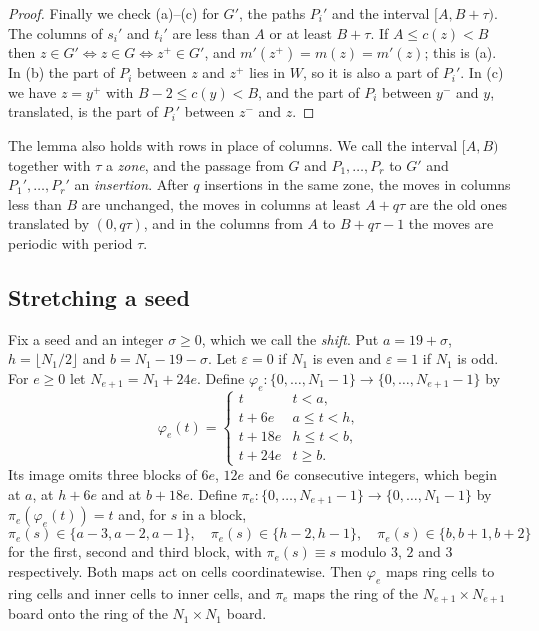 \documentclass[11pt]{amsart}
\theoremstyle{remark}
\begin{document}
\begin{proof}
Finally we check (a)--(c) for $G'$, the paths $P_i'$ and the interval $[A,B+\tau)$. The columns of $s_i'$ and
$t_i'$ are less than $A$ or at least $B+\tau$. If $A\le c(z)<B$ then
$z\in G'\iff z\in G\iff z^+\in G'$, and $m'(z^+)=m(z)=m'(z)$; this is (a). In (b) the part of $P_i$ between $z$ and
$z^+$ lies in $W$, so it is also a part of $P_i'$. In (c) we have $z=y^+$ with $B-2\le c(y)<B$, and the part of
$P_i$ between $y^-$ and $y$, translated, is the part of $P_i'$ between $z^-$ and $z$.
\end{proof}

The lemma also holds with rows in place of columns. We call the interval $[A,B)$ together with $\tau$ a
\emph{zone}, and the passage from $G$ and $P_1,\dots,P_r$ to $G'$ and $P_1',\dots,P_r'$ an \emph{insertion}. After
$q$ insertions in the same zone, the moves in columns less than $B$ are unchanged, the moves in columns at least
$A+q\tau$ are the old ones translated by $(0,q\tau)$, and in the columns from $A$ to $B+q\tau-1$ the moves are
periodic with period $\tau$.

\subsection*{Stretching a seed}
Fix a seed and an integer $\sigma\ge0$, which we call the \emph{shift}. Put $a=19+\sigma$,
$h=\lfloor N_1/2\rfloor$ and $b=N_1-19-\sigma$. Let $\varepsilon=0$ if $N_1$ is even and
$\varepsilon=1$ if $N_1$ is odd. For $e\ge0$ let $N_{e+1}=N_1+24e$. Define
$\varphi_e\colon\{0,\dots,N_1-1\}\to\{0,\dots,N_{e+1}-1\}$ by
\[ \varphi_e(t)=\begin{cases} t & t<a,\\ t+6e & a\le t<h,\\ t+18e & h\le t<b,\\ t+24e & t\ge b.\end{cases} \]
Its image omits three blocks of $6e$, $12e$ and $6e$ consecutive integers, which begin at $a$, at $h+6e$ and at
$b+18e$. Define $\pi_e\colon\{0,\dots,N_{e+1}-1\}\to\{0,\dots,N_1-1\}$ by $\pi_e(\varphi_e(t))=t$ and, for $s$ in a
block,
\[ \pi_e(s)\in\{a-3,a-2,a-1\},\quad \pi_e(s)\in\{h-2,h-1\},\quad \pi_e(s)\in\{b,b+1,b+2\} \]
for the first, second and third block, with $\pi_e(s)\equiv s$ modulo $3$, $2$ and $3$ respectively. Both maps act
on cells coordinatewise. Then $\varphi_e$ maps ring cells to ring cells and inner cells to inner cells, and $\pi_e$
maps the ring of the $N_{e+1}\times N_{e+1}$ board onto the ring of the $N_1\times N_1$ board.
\end{document}
